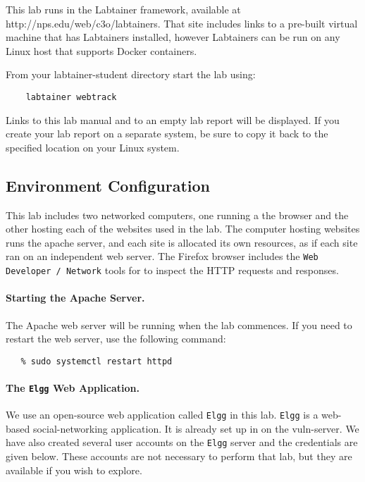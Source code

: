 
This lab runs in the Labtainer framework,
available at http://nps.edu/web/c3o/labtainers.
That site includes links to a pre-built virtual machine
that has Labtainers installed, however Labtainers can
be run on any Linux host that supports Docker containers.

From your labtainer-student directory start the lab using:
\begin{verbatim}
    labtainer webtrack
\end{verbatim}
Links to this lab manual and to an empty lab report will be displayed.  If you create your lab report on a separate system,
be sure to copy it back to the specified location on your Linux system.

\subsection{Environment Configuration}
This lab includes two networked computers, one running a the browser
and the other hosting each of the websites used in the lab. The computer
hosting websites runs the apache server, and each site is allocated its 
own resources, as if each site ran on an independent web server.
The Firefox browser includes the  \texttt{Web Developer / Network} tools for 
to inspect the HTTP requests and responses.  


\paragraph{Starting the Apache Server.}
The Apache web server will be running when the lab
commences.  If you need to restart the web server, use
the following command:
\begin{verbatim}
   % sudo systemctl restart httpd
\end{verbatim}

\paragraph{The {\tt Elgg} Web Application.}
We use an open-source web application called {\tt Elgg} in this lab.
{\tt Elgg} is a web-based social-networking application. 
It is already set up in on the vuln-server.
We have also created several user accounts on the {\tt Elgg} server and the credentials are given below.
These accounts are not necessary to perform that lab, but they are available if you wish to explore.


